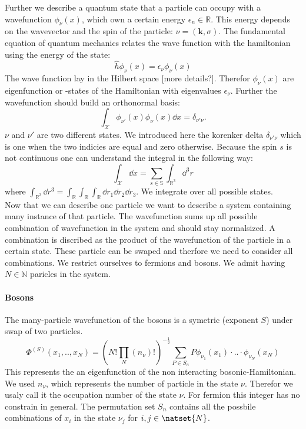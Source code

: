 \documentclass[../main.tex]{subfile}
\begin{document}
Further we describe a quantum state that a particle can occupy with a wavefunction $\phi_{\nu}(x)$, 
which own a certain energy $\epsilon_n \in\mathbb{R}$. This energy depends on 
the wavevector and the spin of the particle: $\nu = (\bm{k}, \sigma)$. The fundamental equation of
quantum mechanics relates the wave function with the hamiltonian using the energy of the state:
\[
    \hat{h} \phi_{\nu}(x) = \epsilon_\nu \phi_{\nu}(x)
\]
The wave function lay in the Hilbert space [more details?]. Therefor $\phi_{\nu}(x)$ are eigenfunction or -states of
the Hamiltonian with eigenvalues $\epsilon_{\nu}$. Further the wavefunction should build an orthonormal basis:
\[
    \int_\mathcal{X} \phi_{\nu'}(x) \phi_{\nu}(x) \dd x = \delta_{\nu'\nu}.
\]
$\nu$ and $\nu'$ are two different states. We introduced here the korenker delta $\delta_{\nu'\nu}$ which is one when the two indicies
are equal and zero otherwise. Because the spin $s$ is not continuous one can understand the integral in the following way:
\[
    \int_\mathcal{X} \dd x = \sum_{s\in \mathbb{S}} \int_{\mathbb{R}^3} \dd^3 r
\]  
where $ \int_{\mathbb{R}^3}\dd r^3 = \int_{\mathbb{R}}\int_{\mathbb{R}}\int_{\mathbb{R}} \dd r_1 \dd r_2 \dd r_3$.
We integrate over all possible states.\\

Now that we can describe one particle we want to describe a system containing many instance of that particle.
The wavefunction sums up all possible combination of wavefunction in the system and should stay normalsized. 
A combination is discribed as the product of the wavefunction of the particle in a certain state. These particle
can be swaped and therfore we need to consider all combinations.
 We restrict ourselves to fermions and bosons. We admit having $N \in \mathbb{N}$ paricles in the system.\\

\paragraph{Bosons}
The many-particle wavefunction of the bosons is a symetric (exponent $S$) under swap of two particles.
\[
    \Phi^{(S)}(x_1,..,x_N) = \left(N!\prod_{N}(n_{\nu})!\right)^{-\frac{1}{2}} \sum_{P\in S_n} P \phi_{\nu_1}(x_1)\cdot ..\cdot \phi_{\nu_N}(x_N)
\]
This represents the an eigenfunction of the non interacting bosonic-Hamiltonian.
We used $n_{\nu}$, which represents the number of particle in the state $\nu$. Therefor we usaly call it the occupation number of the state $\nu$.
For fermion this integer has no constrain in general.
The permutation set $S_n$ contains all the possbile combinations of $x_i$ in the state $\nu_j$ for $i,j\in\natset{N}$.
\end{document}
